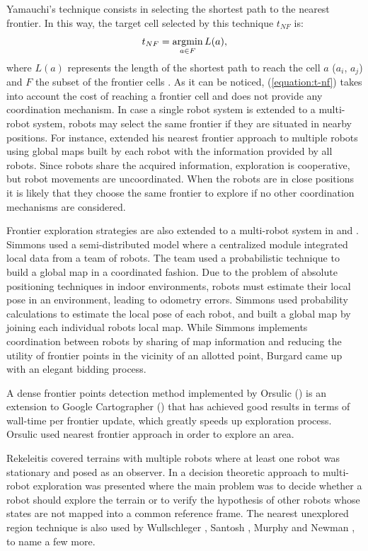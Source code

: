 Yamauchi's technique consists in selecting the shortest path to the nearest frontier. In this way, the target cell selected by this technique $t_{NF}$ is:
\begin{equation}
t_{NF} = \operatorname*{argmin}_{a \in F} L(a), 
\label{equation:t-nf}
\end{equation}
where $L(a)$ represents the length of the shortest path to reach the cell $a$ ($a_{i}$, $a_{j}$) and $F$ the subset of the frontier cells \cite{Julia2012}. As it can be noticed, (\ref{equation:t-nf}) takes into account the cost of reaching a frontier cell and does not provide any coordination mechanism. In case a single robot system is extended to a multi-robot system, robots may select the same frontier if they are situated in nearby positions. For instance, \cite{Yamauchi1998} extended his nearest frontier approach to multiple robots using global maps built by each robot with the information provided by all robots. Since robots share the acquired information, exploration is cooperative, but robot movements are uncoordinated. When the robots are in close positions it is likely that they choose the same frontier to explore if no other coordination mechanisms are considered.

Frontier exploration strategies are also extended to a multi-robot system in \cite{Simmons2000} and \cite{Burgard2005}. Simmons \cite{Simmons2000} used a semi-distributed model where a centralized module integrated local data from a team of robots. The team used a probabilistic technique to build a global map in a coordinated fashion. Due to the problem of absolute positioning techniques in indoor environments, robots must estimate their local pose in an environment, leading to odometry errors. Simmons used probability calculations to estimate the local pose of each robot, and built a global map by joining each individual robots local map. 
While Simmons \cite{Simmons2000} implements coordination between robots by sharing of map information and reducing the utility of frontier points in the vicinity of an allotted point, Burgard \cite{Burgard2005} came up with an elegant bidding process. 

A dense frontier points detection method implemented by Orsulic (\cite{Orsulic2019}) is an extension to Google Cartographer (\cite{Hess2016}) that has achieved good results in terms of wall-time per frontier update, which greatly speeds up exploration process. Orsulic used nearest frontier approach in order to explore an area. 

Rekeleitis \cite{Rekeleitis2000} covered terrains with multiple robots where at least one robot was stationary and posed as an observer. In \cite{Fox2006} a decision theoretic approach to multi-robot exploration was presented where the main problem was to decide whether a robot should explore the terrain or to verify the hypothesis of other robots whose states are not mapped into a common reference frame. The nearest unexplored region technique is also used by Wullschleger \cite{Wullschleger99}, Santosh \cite{Santosh2008}, Murphy and Newman \cite{Murphy2008}, to name a few more.


